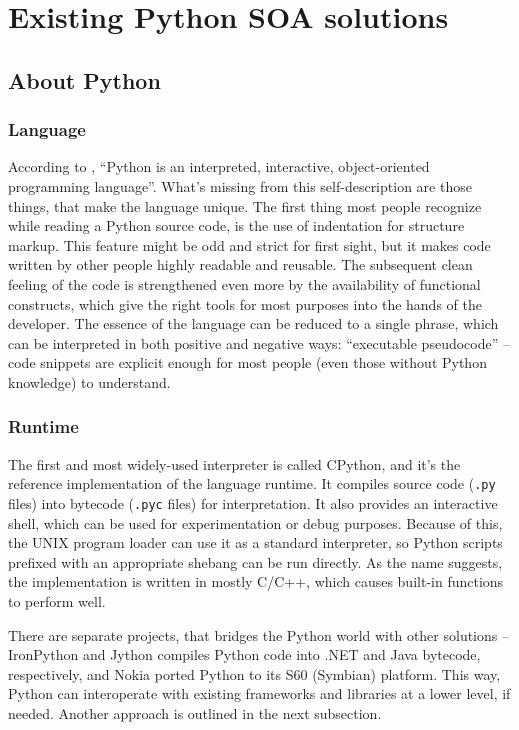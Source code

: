 \chapter{Existing Python SOA solutions}

\section{About Python}

\subsection{Language}

According to \cite{python-faq}, ``Python is an interpreted, interactive, object-oriented programming language''. What's missing from this self-description are those things, that make the language unique. The first thing most people recognize while reading a Python source code, is the use of indentation for structure markup. This feature might be odd and strict for first sight, but it makes code written by other people highly readable and reusable. The subsequent clean feeling of the code is strengthened even more by the availability of functional constructs, which give the right tools for most purposes into the hands of the developer. The essence of the language can be reduced to a single phrase, which can be interpreted in both positive and negative ways: ``executable pseudocode'' -- code snippets are explicit enough for most people (even those without Python knowledge) to understand.

\subsection{Runtime}

The first and most widely-used interpreter is called CPython, and it's the reference implementation of the language runtime. It compiles source code (\verb|.py| files) into bytecode (\verb|.pyc| files) for interpretation. It also provides an interactive shell, which can be used for experimentation or debug purposes. Because of this, the UNIX program loader can use it as a standard interpreter, so Python scripts prefixed with an appropriate shebang can be run directly. As the name suggests, the implementation is written in mostly C/C++, which causes built-in functions to perform well.

There are separate projects, that bridges the Python world with other solutions -- IronPython and Jython compiles Python code into .NET and Java bytecode, respectively, and Nokia ported Python to its S60 (Symbian) platform. This way, Python can interoperate with existing frameworks and libraries at a lower level, if needed. Another approach is outlined in the next subsection.

